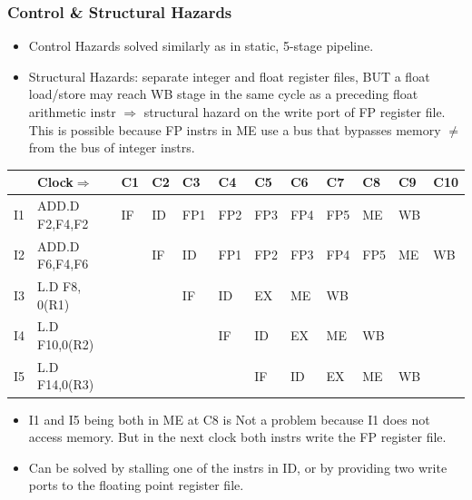 \documentclass{beamer}
\renewcommand{\emph}[1]{\textcolor{structure}{#1}}
\newcommand{\emp}[1]{\textcolor{DikuRed}{ #1}}
\begin{document}
\begin{frame}[fragile,t]
\frametitle{Control \& Structural Hazards}

\bigskip

\begin{scriptsize}
\begin{itemize}
\item \emp{Control Hazards} solved similarly as in static, 5-stage pipeline.\smallskip
\item \emp{Structural Hazards}: separate integer and float register files, BUT
        a float load/store may reach WB stage in the same cycle as a preceding
        float arithmetic instr $\Rightarrow$ structural hazard \emp{on the write port 
        of FP register file}.   \emph{This is possible because FP instrs in ME use
        a bus that bypasses memory $\neq$ from the bus of integer instrs.}  
\end{itemize}
\bigskip

\begin{tiny}
\begin{tabular}{llllllllllll}
\hline
   & Clock$\Rightarrow$ & C1 & C2 & C3 & C4 & C5 & C6 & C7 & C8 & C9 & C10            \\\hline
I1 & ADD.D F2,F4,F2     & IF & ID & FP1 & FP2 & FP3 & FP4 & FP5 & ME & \alert{WB} &      \\
I2 & ADD.D F6,F4,F6     &    & IF & ID & FP1 & FP2 & FP3 & FP4 & FP5 & ME & WB   \\
I3 & L.D   F8, 0(R1)    &    &    & IF & ID  & EX  & ME  & WB  &     &    &      \\
I4 & L.D   F10,0(R2)    &    &    &    & IF  & ID  & EX  & ME  & WB  &    &      \\
I5 & L.D   F14,0(R3)    &    &    &    &     & IF  & ID  & EX  & ME  & \alert{WB} &      \\\hline
\end{tabular}
\end{tiny}
\pause
\bigskip

\begin{itemize}
\item I1 and I5 being both in ME at C8 \emph{is Not a problem} 
        because I1 does not access memory. But in the next clock 
        \emp{both instrs write the FP register} file.\smallskip
\item Can be solved by stalling one of the instrs in ID, or by providing two write ports to
        the floating point register file.
\end{itemize}
\end{scriptsize}
\end{frame}
\end{document}
